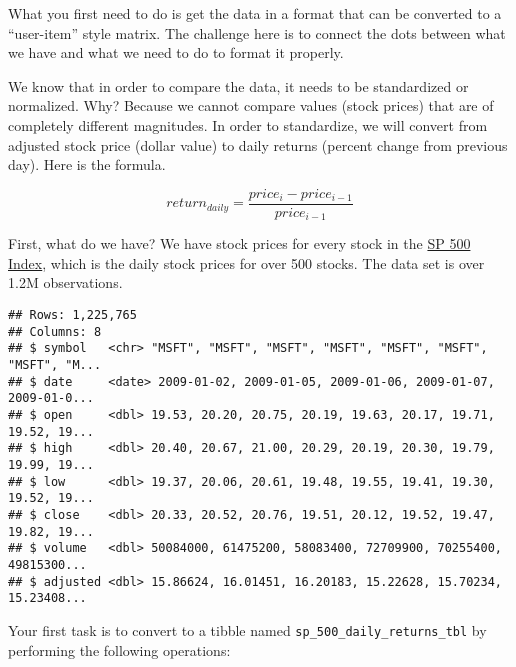 \documentclass[
]{article}
\newenvironment{Shaded}{\begin{snugshade}}{\end{snugshade}}
\newcommand{\DecValTok}[1]{\textcolor[rgb]{0.00,0.00,0.81}{#1}}
\newcommand{\KeywordTok}[1]{\textcolor[rgb]{0.13,0.29,0.53}{\textbf{#1}}}
\newcommand{\NormalTok}[1]{#1}
\newcommand{\OperatorTok}[1]{\textcolor[rgb]{0.81,0.36,0.00}{\textbf{#1}}}
\newcommand{\StringTok}[1]{\textcolor[rgb]{0.31,0.60,0.02}{#1}}
\begin{document}
What you first need to do is get the data in a format that can be
converted to a ``user-item'' style matrix. The challenge here is to
connect the dots between what we have and what we need to do to format
it properly.

We know that in order to compare the data, it needs to be standardized
or normalized. Why? Because we cannot compare values (stock prices) that
are of completely different magnitudes. In order to standardize, we will
convert from adjusted stock price (dollar value) to daily returns
(percent change from previous day). Here is the formula.

\[ 
return_{daily} = \frac{price_{i}-price_{i-1}}{price_{i-1}}
\]

First, what do we have? We have stock prices for every stock in the
\href{https://finance.yahoo.com/quote/\%5EGSPC?p=\%5EGSPC}{SP 500
Index}, which is the daily stock prices for over 500 stocks. The data
set is over 1.2M observations.

\begin{Shaded}
\end{Shaded}

\begin{verbatim}
## Rows: 1,225,765
## Columns: 8
## $ symbol   <chr> "MSFT", "MSFT", "MSFT", "MSFT", "MSFT", "MSFT", "MSFT", "M...
## $ date     <date> 2009-01-02, 2009-01-05, 2009-01-06, 2009-01-07, 2009-01-0...
## $ open     <dbl> 19.53, 20.20, 20.75, 20.19, 19.63, 20.17, 19.71, 19.52, 19...
## $ high     <dbl> 20.40, 20.67, 21.00, 20.29, 20.19, 20.30, 19.79, 19.99, 19...
## $ low      <dbl> 19.37, 20.06, 20.61, 19.48, 19.55, 19.41, 19.30, 19.52, 19...
## $ close    <dbl> 20.33, 20.52, 20.76, 19.51, 20.12, 19.52, 19.47, 19.82, 19...
## $ volume   <dbl> 50084000, 61475200, 58083400, 72709900, 70255400, 49815300...
## $ adjusted <dbl> 15.86624, 16.01451, 16.20183, 15.22628, 15.70234, 15.23408...
\end{verbatim}

Your first task is to convert to a tibble named
\texttt{sp\_500\_daily\_returns\_tbl} by performing the following
operations:
\end{document}
